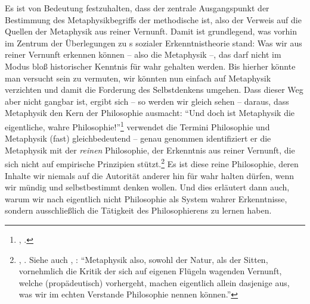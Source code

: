 Es ist von Bedeutung festzuhalten, dass der zentrale
Ausgangspunkt der Bestimmung des Metaphysikbegriffs der methodische ist, also
der Verweis auf die Quellen der Metaphysik aus reiner Vernunft. Damit ist
grundlegend, was vorhin im Zentrum der Überlegungen zu s
sozialer Erkenntnistheorie stand: Was wir aus reiner Vernunft erkennen können
-- also die Metaphysik --, das darf nicht im Modus bloß historischer Kenntnis
für wahr gehalten werden. Bis hierher könnte man versucht sein zu vermuten, wir
könnten nun einfach auf Metaphysik verzichten und damit die Forderung des
Selbstdenkens umgehen. Dass dieser Weg aber nicht gangbar ist, ergibt sich -- so
werden wir gleich sehen -- daraus, dass Metaphysik den Kern der Philosophie
ausmacht: \enquote{Und doch ist Metaphysik die eigentliche, wahre
Philosophie!}\footnote{\cite[][A 39]{Kant:ImmanuelKantsLogik1977}, \cite[][IX:
32.36--37]{Kant:GesammelteWerke1900ff.}.}   verwendet die
Termini Philosophie und Metaphysik (fast) gleichbedeutend -- genau genommen
identifiziert er die Metaphysik mit der \emph{reinen} Philosophie, der
Erkenntnis aus reiner Vernunft, die sich nicht auf empirische Prinzipien
stützt.\footnote{\cite[Vgl.][B~869]{Kant:KritikderreinenVernunft2003},
\cite[][III: 543.27--544.8]{Kant:GesammelteWerke1900ff.}. Siehe auch
\cite[][B~878]{Kant:KritikderreinenVernunft2003}, \cite[][III:
549.13--16]{Kant:GesammelteWerke1900ff.}: \enquote{Metaphysik also, sowohl der
Natur, als der Sitten, vornehmlich die Kritik der sich auf eigenen Flügeln
wagenden Vernunft, welche  (propädeutisch) vorhergeht, machen
eigentlich allein dasjenige aus, was wir im echten Verstande Philosophie nennen
können.}} Es ist diese reine Philosophie, deren Inhalte wir niemals auf die
Autorität anderer hin für wahr halten dürfen, wenn wir mündig und selbstbestimmt
denken wollen. Und dies erläutert dann auch, warum wir nach
 eigentlich nicht Philosophie als System wahrer
Erkenntnisse, sondern ausschließlich die Tätigkeit des Philosophierens zu lernen
haben.

